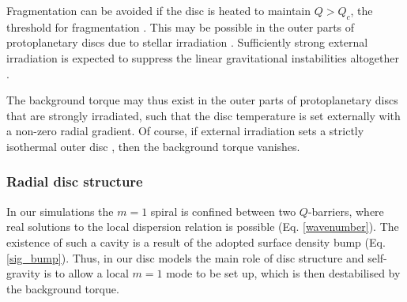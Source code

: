 {  Fragmentation can be avoided if the disc is heated to maintain 
  $Q>Q_c$, the threshold for fragmentation \citep[$Q_c\simeq
  1.4$ for isothermal discs,][]{mayer04}. This may be 
  possible in the outer parts of protoplanetary discs due to
  stellar irradiation \citep{rafikov09,zhu12}. Sufficiently strong
  external irradiation is expected to suppress the linear gravitational
  instabilities altogether \citep{rice11}.  

  The background torque may thus exist in the outer
  parts of protoplanetary discs that are strongly irradiated, such
  that the disc temperature is set externally with a non-zero radial
  gradient. Of course, if external irradiation sets a strictly
  isothermal outer disc \citep[e.g.][]{boley09}, then the background
  torque vanishes.      


  
  
  
 
  \subsubsection{Radial disc structure}
  In our simulations the 
  $m=1$ spiral is confined between two $Q$-barriers, where real solutions to the local
  dispersion relation is possible (Eq. \ref{wavenumber}). The
  existence of such a cavity is a result of the adopted surface
  density bump (Eq. \ref{sig_bump}).  
  Thus, in our disc models the main role of disc structure 
  and self-gravity is to allow a local $m=1$ mode to be set up, which is then 
  destabilised by the background torque. 
  
}
